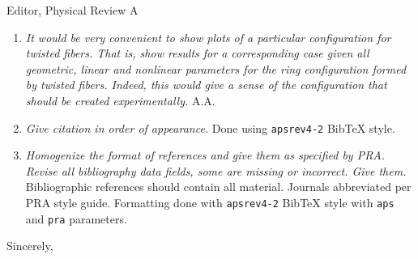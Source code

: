 \documentclass[11pt]{letter}
\begin{document}
\begin{letter}{Editor, Physical Review A}
\begin{enumerate}
\item \emph{It would be very convenient to show plots of a particular configuration for twisted fibers. That is, show results for a corresponding case given all geometric, linear and nonlinear parameters for the ring configuration formed by twisted fibers. Indeed, this would give a sense of the configuration that should be created experimentally.} A.A.

\item \emph{Give citation in order of appearance.} Done using \texttt{apsrev4-2} BibTeX style.

\item \emph{Homogenize the format of references and give them as specified by PRA. Revise all bibliography data fields, some are missing or incorrect. Give them.} Bibliographic references should contain all material. Journals abbreviated per PRA style guide. Formatting done with \texttt{apsrev4-2} BibTeX style with \texttt{aps} and \texttt{pra} parameters.

\end{enumerate}

\closing{Sincerely,}

\end{letter}
\end{document}
